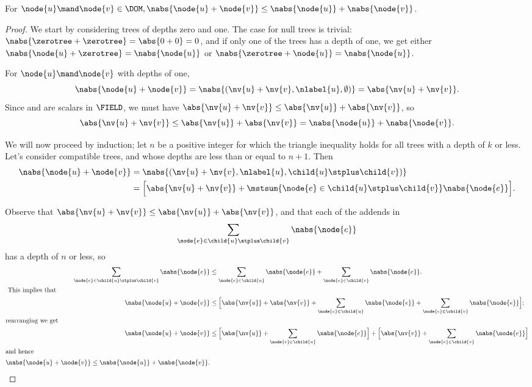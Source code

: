 \begin{proposition}\label{triangle1}
  For \(\node{u} \mand \node{v} \in \DOM, \nabs{\node{u} + \node{v}}
  \leq \nabs{\node{u}} + \nabs{\node{v}}\).

\begin{proof}
  We start by considering trees of depths zero and one. The case for null trees is trivial: \(\nabs{\zerotree +
    \zerotree} = \abs{0 + 0} = 0\), and if only one of the trees has a depth of one, we get either \(\nabs{\node{u} +
    \zerotree} = \nabs{\node{u}}\) or \(\nabs{\zerotree + \node{u}} = \nabs{\node{u}}\).

  For \(\node{u} \mand \node{v}\)  with depths of one, \[\nabs{\node{u} + \node{v}} = \nabs{(\nv{u}+\nv{v}, \nlabel{u}, \emptyset)}= \abs{\nv{u}+\nv{v}}.\]
  Since  and  are scalars in $\FIELD$, we must have
  \(\abs{\nv{u} + \nv{v}} \leq \abs{\nv{u}}+\abs{\nv{v}}\),
  so \[\abs{\nv{u}+\nv{v}} \leq \abs{\nv{u}}+\abs{\nv{v}} = \nabs{\node{u}} + \nabs{\node{v}}.\]

  We will now proceed by induction; let \(n\) be a positive integer for which the triangle inequality holds for all
  trees with a depth of \(k\) or less.  Let's consider compatible trees,  and  whose depths are less
  than or equal to \(n+1\). Then
  \begin{align*}
      \nabs{\node{u} + \node{v}} &= \nabs{(\nv{u} + \nv{v}, \nlabel{u}, \child{u}\stplus\child{v})} \\
      &= \Bigl[\abs{\nv{u} + \nv{v}} + \mstsum{\node{e}\in{\child{u}\stplus\child{v}}}\nabs{\node{e}}\Bigr]. \\
  \end{align*}
  
  Observe that \(\abs{\nv{u} + \nv{v}} \leq \abs{\nv{u}} + \abs{\nv{v}}\), and that each 
  of the addends in \[\sum_{\node{e}\in{\child{u}\stplus\child{v}}}\nabs{\node{e}}\] has a depth of \(n\) or
  less, so 
\begin{align*}
  \sum_{\node{e}\in{\child{u}\stplus\child{v}}}\nabs{\node{e}} &\leq \sum_{\node{e}\in{\child{u}}}\nabs{\node{e}} + \sum_{\node{e}\in\child{v}}\nabs{\node{e}}.\\
  \intertext{ This implies that}
   \nabs{\node{u} + \node{v}} &\leq \Bigl[\abs{\nv{u}} + \abs{\nv{v}} + \sum_{\node{e}\in\child{u}}\nabs{\node{e}} + \sum_{\node{e}\in\child{v}}\nabs{\node{e}}\Bigr];\\
   \intertext{rearranging we get}
   \nabs{\node{u} + \node{v}}  &\leq \Bigl[\abs{\nv{u}} + \sum_{\node{e}\in\child{u}}\nabs{\node{e}}\Bigr] + \Bigl[\abs{\nv{v}} + \sum_{\node{e}\in\child{v}}\nabs{\node{e}}\Bigr] \\
   \intertext{and hence}
   \nabs{\node{u} + \node{v}} \leq \nabs{\node{u}}  + \nabs{\node{v}}.
\end{align*}
\end{proof}
\end{proposition}

